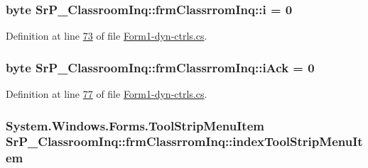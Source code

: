 \hypertarget{class_sr_p___classroom_inq_1_1frm_classrrom_inq_aa757c37b373c81fd9ac14b89ad217df0}{
\subsubsection[{i}]{\setlength{\rightskip}{0pt plus 5cm}byte {\bf \-Sr\-P\-\_\-\-Classroom\-Inq\-::frm\-Classrrom\-Inq\-::i} = 0}}
\label{class_sr_p___classroom_inq_1_1frm_classrrom_inq_aa757c37b373c81fd9ac14b89ad217df0}


\-Definition at line \hyperlink{_form1-dyn-ctrls_8cs_source_l00073}{73} of file \hyperlink{_form1-dyn-ctrls_8cs_source}{\-Form1-\/dyn-\/ctrls.\-cs}.

\hypertarget{class_sr_p___classroom_inq_1_1frm_classrrom_inq_a3eefb413ee1ce6cd615c0d1af7cee8d3}{
\subsubsection[{i\-Ack}]{\setlength{\rightskip}{0pt plus 5cm}byte {\bf \-Sr\-P\-\_\-\-Classroom\-Inq\-::frm\-Classrrom\-Inq\-::i\-Ack} = 0}}
\label{class_sr_p___classroom_inq_1_1frm_classrrom_inq_a3eefb413ee1ce6cd615c0d1af7cee8d3}


\-Definition at line \hyperlink{_form1-dyn-ctrls_8cs_source_l00077}{77} of file \hyperlink{_form1-dyn-ctrls_8cs_source}{\-Form1-\/dyn-\/ctrls.\-cs}.

\hypertarget{class_sr_p___classroom_inq_1_1frm_classrrom_inq_a650650a8a1948b902bae347f3cdf9679}{
\subsubsection[{index\-Tool\-Strip\-Menu\-Item}]{\setlength{\rightskip}{0pt plus 5cm}\-System.\-Windows.\-Forms.\-Tool\-Strip\-Menu\-Item {\bf \-Sr\-P\-\_\-\-Classroom\-Inq\-::frm\-Classrrom\-Inq\-::index\-Tool\-Strip\-Menu\-Item}}}
\label{class_sr_p___classroom_inq_1_1frm_classrrom_inq_a650650a8a1948b902bae347f3cdf9679}


